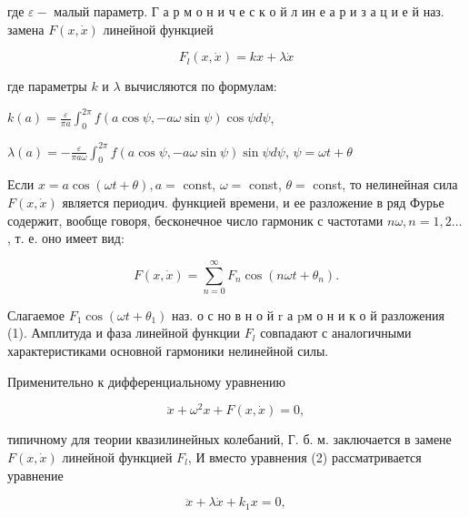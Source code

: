\documentclass[10pt]{article}
\begin{document}
где $\varepsilon-$ малый параметр. Г а р м о н и ч е с к о й л ин е а р и з а ц и е й наз. замена $F(x, \dot{x})$ линейной функцией



\[

F_{l}(x, \dot{x})=k x+\lambda \dot{x}

\]



где параметры $k$ и $\lambda$ вычисляются по формулам:



$k(a)=\frac{\varepsilon}{\pi a} \int_{0}^{2 \pi} f(a \cos \psi,-a \omega \sin \psi) \cos \psi d \psi$,



$\lambda(a)=-\frac{\varepsilon}{\pi a \omega} \int_{0}^{2 \pi} f(a \cos \psi,-a \omega \sin \psi) \sin \psi d \psi$, $\psi=\omega t+\theta$



Если $x=a \cos (\omega t+\theta), a=$ const, $\omega=$ const, $\theta=$ const, то нелинейная сила $F(x, \dot{x})$ является периодич. функцией времени, и ее разложение в ряд Фурье содержит, вообще говоря, бесконечное число гармоник с частотами $n \omega, n=1,2 \ldots$, т. е. оно имеет вид:



\[

F(x, \dot{x})=\sum_{n=0}^{\infty} F_{n} \cos \left(n \omega t+\theta_{n}\right) .

\]



Слагаемое $F_{1} \cos \left(\omega t+\theta_{1}\right)$ наз. о с но в н о й $\mathrm{r}$ а pм о н и к о й разложения (1). Амплитуда и фаза линейной функции $F_{l}$ совпадают с аналогичными характеристиками основной гармоники нелинейной силы.



Применительно к дифференциальному уравнению



\[

\ddot{x}+\omega^{2} x+F(x, \dot{x})=0,

\]



типичному для теории квазилинейных колебаний, Г. б. м. заключается в замене $F(x, \dot{x})$ линейной функцией $F_{l}$, И вместо уравнения (2) рассматривается уравнение



\[

\ddot{x}+\lambda \dot{x}+k_{1} x=0,

\]
\end{document}

